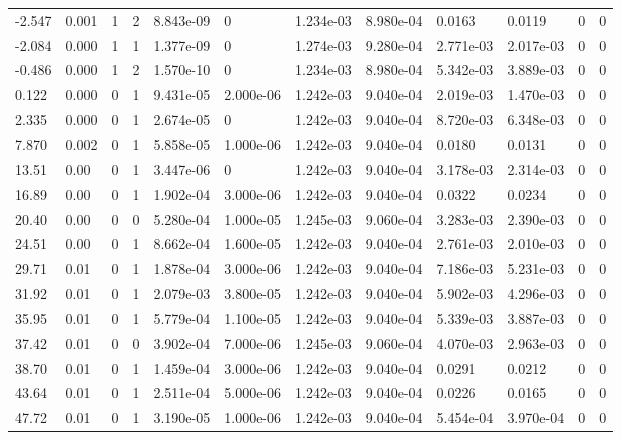 \documentclass[preview]{standalone}
\begin{document}
{{\begin{tabular}{L{1.2cm}C{1.2cm} C{0.3cm}C{0.5cm} C{1.4cm}C{1.4cm} C{1.4cm}C{1.4cm} C{1.6cm}C{1.6cm} C{1.6cm}C{1.6cm}}
  -2.547  &  0.001  & 1     &  2 &  8.843e-09  & 0  &  1.234e-03&   8.980e-04& 0.0163 & 0.0119   &  0 & 0  \\ 
  -2.084  &  0.000  & 1     &  1 &  1.377e-09  & 0  &  1.274e-03&   9.280e-04& 2.771e-03 & 2.017e-03   &  0 & 0  \\ 
  -0.486  &  0.000  & 1     &  2 &  1.570e-10  & 0  &  1.234e-03&   8.980e-04& 5.342e-03 & 3.889e-03   &  0 & 0  \\ 
  0.122  &  0.000  & 0     &  1 &  9.431e-05  & 2.000e-06  &  1.242e-03&   9.040e-04& 2.019e-03 & 1.470e-03   &  0 & 0  \\ 
  2.335  &  0.000  & 0     &  1 &  2.674e-05  & 0  &  1.242e-03&   9.040e-04& 8.720e-03 & 6.348e-03   &  0 & 0  \\ 
  7.870  &  0.002  & 0     &  1 &  5.858e-05  & 1.000e-06  &  1.242e-03&   9.040e-04& 0.0180 & 0.0131   &  0 & 0  \\ 
  13.51  &  0.00  & 0     &  1 &  3.447e-06  & 0  &  1.242e-03&   9.040e-04& 3.178e-03 & 2.314e-03   &  0 & 0  \\ 
  16.89  &  0.00  & 0     &  1 &  1.902e-04  & 3.000e-06  &  1.242e-03&   9.040e-04& 0.0322 & 0.0234   &  0 & 0  \\ 
  20.40  &  0.00  & 0     &  0 &  5.280e-04  & 1.000e-05  &  1.245e-03&   9.060e-04& 3.283e-03 & 2.390e-03   &  0 & 0  \\ 
  24.51  &  0.00  & 0     &  1 &  8.662e-04  & 1.600e-05  &  1.242e-03&   9.040e-04& 2.761e-03 & 2.010e-03   &  0 & 0  \\ 
  29.71  &  0.01  & 0     &  1 &  1.878e-04  & 3.000e-06  &  1.242e-03&   9.040e-04& 7.186e-03 & 5.231e-03   &  0 & 0  \\ 
  31.92  &  0.01  & 0     &  1 &  2.079e-03  & 3.800e-05  &  1.242e-03&   9.040e-04& 5.902e-03 & 4.296e-03   &  0 & 0  \\ 
  35.95  &  0.01  & 0     &  1 &  5.779e-04  & 1.100e-05  &  1.242e-03&   9.040e-04& 5.339e-03 & 3.887e-03   &  0 & 0  \\ 
  37.42  &  0.01  & 0     &  0 &  3.902e-04  & 7.000e-06  &  1.245e-03&   9.060e-04& 4.070e-03 & 2.963e-03   &  0 & 0  \\ 
  38.70  &  0.01  & 0     &  1 &  1.459e-04  & 3.000e-06  &  1.242e-03&   9.040e-04& 0.0291 & 0.0212   &  0 & 0  \\ 
  43.64  &  0.01  & 0     &  1 &  2.511e-04  & 5.000e-06  &  1.242e-03&   9.040e-04& 0.0226 & 0.0165   &  0 & 0  \\ 
  47.72  &  0.01  & 0     &  1 &  3.190e-05  & 1.000e-06  &  1.242e-03&   9.040e-04& 5.454e-04 & 3.970e-04   &  0 & 0  \\ 

\end{tabular}}}
\end{document}
